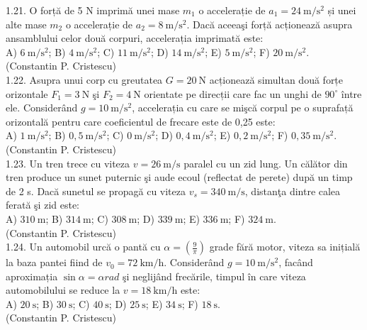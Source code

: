 \documentclass[10pt]{article}
\begin{document}
1.21. O forță de 5 N imprimă unei mase $m_{1}$ o accelerație de $a_{1}=24 \mathrm{~m} / \mathrm{s}^{2}$ și unei alte mase $m_{2}$ o accelerație de $a_{2}=8 \mathrm{~m} / \mathrm{s}^{2}$. Dacă aceeaşi forță acționează asupra ansamblului celor două corpuri, accelerația imprimată este:\\ A) $6 \mathrm{~m} / \mathrm{s}^{2}$; B) $4 \mathrm{~m} / \mathrm{s}^{2}$; C) $11 \mathrm{~m} / \mathrm{s}^{2}$; D) $14 \mathrm{~m} / \mathrm{s}^{2}$; E) $5 \mathrm{~m} / \mathrm{s}^{2}$; F) $20 \mathrm{~m} / \mathrm{s}^{2}$.\\ (Constantin P. Cristescu)\\

1.22. Asupra unui corp cu greutatea $G=20 \mathrm{~N}$ acționează simultan două forțe orizontale $F_{1}=3 \mathrm{~N}$ şi $F_{2}=4 \mathrm{~N}$ orientate pe direcții care fac un unghi de $90^{\circ}$ între ele. Considerând $g=10 \mathrm{~m} / \mathrm{s}^{2}$, accelerația cu care se mişcă corpul pe o suprafață orizontală pentru care coeficientul de frecare este de 0,25 este:\\ A) $1 \mathrm{~m} / \mathrm{s}^{2}$; B) $0,5 \mathrm{~m} / \mathrm{s}^{2}$; C) $0 \mathrm{~m} / \mathrm{s}^{2}$; D) $0,4 \mathrm{~m} / \mathrm{s}^{2}$; E) $0,2 \mathrm{~m} / \mathrm{s}^{2}$; F) $0,35 \mathrm{~m} / \mathrm{s}^{2}$.\\ (Constantin P. Cristescu)\\

1.23. Un tren trece cu viteza $v=26 \mathrm{~m} / \mathrm{s}$ paralel cu un zid lung. Un călător din tren produce un sunet puternic şi aude ecoul (reflectat de perete) după un timp de 2 s. Dacă sunetul se propagă cu viteza $v_{s}=340 \mathrm{~m} / \mathrm{s}$, distanţa dintre calea ferată şi zid este:\\ A) $310 \mathrm{~m}$; B) $314 \mathrm{~m}$; C) $308 \mathrm{~m}$; D) $339 \mathrm{~m}$; E) $336 \mathrm{~m}$; F) $324 \mathrm{~m}$.\\ (Constantin P. Cristescu)\\

1.24. Un automobil urcă o pantă cu $\alpha=\left(\frac{9}{\pi}\right)$ grade fără motor, viteza sa inițială la baza pantei fiind de $v_{0}=72 \mathrm{~km} / \mathrm{h}$. Considerând $g=10 \mathrm{~m} / \mathrm{s}^{2}$, facând aproximația $\sin \alpha=\alpha rad$ şi neglijând frecările, timpul în care viteza automobilului se reduce la $v=18 \mathrm{~km} / \mathrm{h}$ este:\\ A) $20 \mathrm{~s}$; B) $30 \mathrm{~s}$; C) $40 \mathrm{~s}$; D) $25 \mathrm{~s}$; E) $34 \mathrm{~s}$; F) $18 \mathrm{~s}$.\\ (Constantin P. Cristescu)\\
\end{document}

